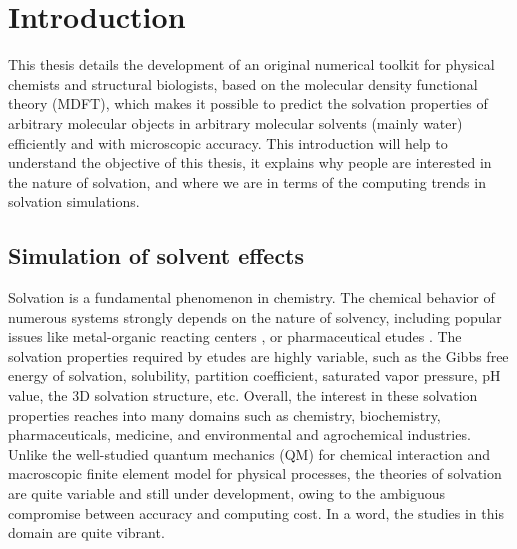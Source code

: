 
\chapter{Introduction\label{chpt:introduction}}

This thesis details the development of an original numerical toolkit for
physical chemists and structural biologists, based on the molecular
density functional theory (\acs{MDFT}), which makes it possible to
predict the solvation properties of arbitrary molecular objects in arbitrary molecular solvents
(mainly water) efficiently and with microscopic accuracy. This introduction will help to understand the objective
of this thesis, it explains why people are interested in the nature
of solvation, and where we are in terms of the computing trends in solvation
simulations.


\section{Simulation of solvent effects}

Solvation is a fundamental phenomenon in chemistry. The chemical behavior
of numerous systems strongly depends on the nature of solvency, including popular issues like metal-organic reacting centers
\citep{Mn-oxo,PCET}, or pharmaceutical etudes \citep{drug_1_Perlovich,drug_2_Perlovich,drug_3}.
The solvation properties required by etudes %
are highly variable, such
as the Gibbs free energy of solvation, solubility, partition coefficient,
saturated vapor pressure, pH value, the 3D solvation structure,
etc. Overall, the interest in these solvation properties reaches into
many domains such as chemistry, biochemistry, pharmaceuticals, medicine, and
environmental and agrochemical industries. Unlike the well-studied
quantum mechanics (\acs{QM}) for chemical interaction and macroscopic
finite element model for physical processes, the theories of solvation
are quite variable and still under development, owing to the ambiguous
compromise between accuracy and computing cost. In a word,
the studies in this domain are quite vibrant.

